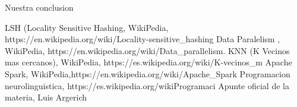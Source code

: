 \documentclass[a4paper,10pt]{article}
\begin{document}
	Nuestra conclusion
	
	\begin{thebibliography}{99}
		 LSH (Locality Sensitive Hashing, WikiPedia, https://en.wikipedia.org/wiki/Locality-sensitive_hashing
		 Data Paralelism , WikiPedia, https://en.wikipedia.org/wiki/Data_parallelism.
		 KNN (K Vecinos mas cercanos), WikiPedia, https://es.wikipedia.org/wiki/K-vecinos_m%
		 Apache Spark, WikiPedia,https://en.wikipedia.org/wiki/Apache_Spark
		 Programacion neurolinguistica, https://es.wikipedia.org/wikiProgramaci%
		 Apunte oficial de la materia, Luis Argerich

	\end{thebibliography}
	
\end{document}
